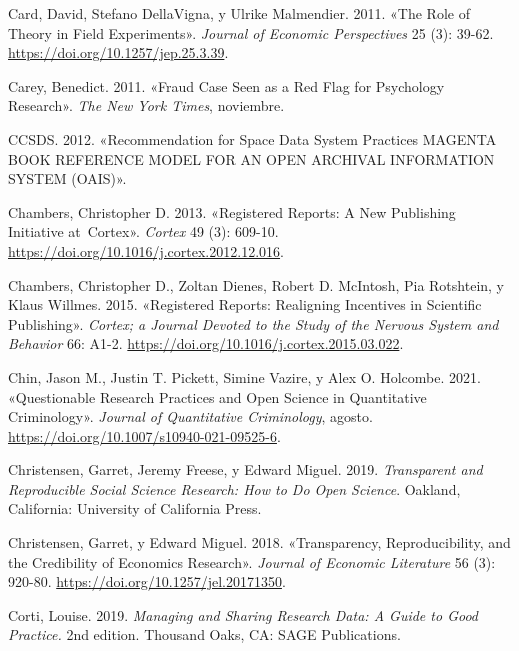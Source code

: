 \documentclass[
  spanish,
  letterpaper,
  DIV=11,
  numbers=noendperiod]{scrreprt}
\newlength{\cslhangindent}
\newenvironment{CSLReferences}[2] %
 {\begin{list}{}{%
  \setlength{\itemindent}{0pt}
  \setlength{\leftmargin}{0pt}
  \setlength{\parsep}{0pt}
  \ifodd #1
   \setlength{\leftmargin}{\cslhangindent}
   \setlength{\itemindent}{-1\cslhangindent}
  \fi
  \setlength{\itemsep}{#2\baselineskip}}}
 {\end{list}}
\begin{document}
\begin{CSLReferences}{1}{0}
Card, David, Stefano DellaVigna, y Ulrike Malmendier. 2011. {«The {Role}
of {Theory} in {Field Experiments}»}. \emph{Journal of Economic
Perspectives} 25 (3): 39-62. \url{https://doi.org/10.1257/jep.25.3.39}.

Carey, Benedict. 2011. {«Fraud {Case Seen} as a {Red Flag} for
{Psychology Research}»}. \emph{The New York Times}, noviembre.

CCSDS. 2012. {«Recommendation for {Space Data System Practices MAGENTA
BOOK REFERENCE MODEL FOR AN OPEN ARCHIVAL INFORMATION SYSTEM}
({OAIS})»}.

Chambers, Christopher D. 2013. {«Registered {Reports}: {A} New
Publishing Initiative at~{Cortex}»}. \emph{Cortex} 49 (3): 609-10.
\url{https://doi.org/10.1016/j.cortex.2012.12.016}.

Chambers, Christopher D., Zoltan Dienes, Robert D. McIntosh, Pia
Rotshtein, y Klaus Willmes. 2015. {«Registered Reports: Realigning
Incentives in Scientific Publishing»}. \emph{Cortex; a Journal Devoted
to the Study of the Nervous System and Behavior} 66: A1-2.
\url{https://doi.org/10.1016/j.cortex.2015.03.022}.

Chin, Jason M., Justin T. Pickett, Simine Vazire, y Alex O. Holcombe.
2021. {«Questionable {Research Practices} and {Open Science} in
{Quantitative Criminology}»}. \emph{Journal of Quantitative
Criminology}, agosto. \url{https://doi.org/10.1007/s10940-021-09525-6}.

Christensen, Garret, Jeremy Freese, y Edward Miguel. 2019.
\emph{Transparent and Reproducible Social Science Research: How to Do
Open Science}. Oakland, California: University of California Press.

Christensen, Garret, y Edward Miguel. 2018. {«Transparency,
{Reproducibility}, and the {Credibility} of {Economics Research}»}.
\emph{Journal of Economic Literature} 56 (3): 920-80.
\url{https://doi.org/10.1257/jel.20171350}.

Corti, Louise. 2019. \emph{Managing and {Sharing Research Data}: {A
Guide} to {Good Practice}.} 2nd edition. Thousand Oaks, CA: SAGE
Publications.


\end{CSLReferences}
\end{document}
